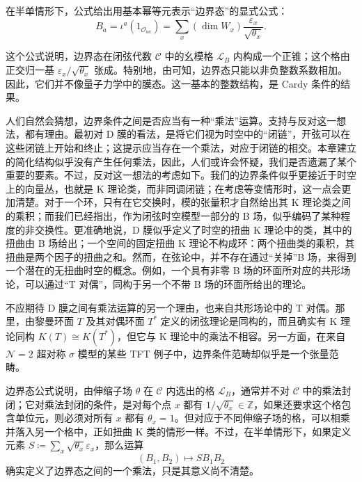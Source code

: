 在半单情形下，公式给出用基本幂等元表示“边界态”的显式公式：
\begin{equation}\label{eq:2.54}
B_a=\iota^a(1_{\mathcal{O}_{aa}})
=\sum_x(\dim W_x)\frac{\varepsilon_x}{\sqrt{\theta_x}}.
\end{equation}

这个公式说明，边界态在闭弦代数 $\mathcal{C}$ 中的幺模格 $\mathcal{L}_B$ 内构成一个正锥；这个格由正交归一基 $\varepsilon_x/\sqrt{\theta_x}$ 张成。特别地，由可知，边界态只能以非负整数系数相加。因此，它们并不像量子力学中的膜态。这一基本的整数结构，是 Cardy 条件的结果。

人们自然会猜想，边界条件之间是否应当有一种“乘法”运算。支持与反对这一想法，都有理由。最初对 D 膜的看法，是将它们视为时空中的“闭链”，开弦可以在这些闭链上开始和终止；这提示应当存在一个乘法，对应于闭链的相交。本章建立的简化结构似乎没有产生任何乘法，因此，人们或许会怀疑，我们是否遗漏了某个重要的要素。不过，反对这一想法的考虑如下。我们的边界条件似乎更接近于时空上的向量丛，也就是 K 理论类，而非同调闭链；在考虑等变情形时，这一点会更加清楚。对于一个环，只有在它交换时，模的张量积才自然给出其 K 理论类之间的乘积；而我们已经指出，作为闭弦时空模型一部分的 B 场，似乎编码了某种程度的非交换性。更准确地说，D 膜似乎定义了时空的扭曲 K 理论中的类，其中的扭曲由 B 场给出；一个空间的固定扭曲 K 理论不构成环：两个扭曲类的乘积，其扭曲是两个因子的扭曲之和。然而，在弦论中，并不存在通过“关掉”B 场，来得到一个潜在的无扭曲时空的概念。例如，一个具有非零 B 场的环面所对应的共形场论，可以通过“T 对偶”，同构于另一个不带 B 场的环面所给出的理论。

不应期待 D 膜之间有乘法运算的另一个理由，也来自共形场论中的 T 对偶。那里，由黎曼环面 $T$ 及其对偶环面 $T^*$ 定义的闭弦理论是同构的，而且确实有 K 理论同构 $K(T)\cong K(T^*)$，但它与 K 理论中的乘法不相容。另一方面，在来自 $\mathcal{N}=2$ 超对称 $\sigma$ 模型的某些 TFT 例子中，边界条件范畴却似乎是一个张量范畴。

边界态公式说明，由伸缩子场 $\theta$ 在 $\mathcal{C}$ 内选出的格 $\mathcal{L}_B$，通常并不对 $\mathcal{C}$ 中的乘法封闭；它对乘法封闭的条件，是对每个点 $x$ 都有 $1/\sqrt{\theta_x}\in\mathbb{Z}$，如果还要求这个格包含单位元，则必须对所有 $x$ 都有 $\theta_x=1$。但对应于不同伸缩子场的格，可以相乘并落入另一个格中，正如扭曲 K 类的情形一样。不过，在半单情形下，如果定义元素 $S\coloneqq\sum_x\sqrt{\theta_x}\varepsilon_x$，那么运算
\begin{equation}\label{eq:2.55}
(B_1,B_2)\longmapsto SB_1B_2
\end{equation}
确实定义了边界态之间的一个乘法，只是其意义尚不清楚。


